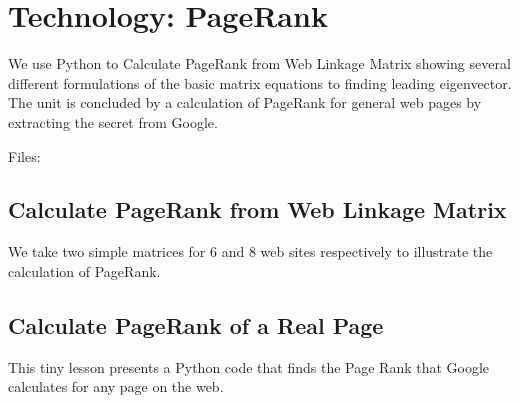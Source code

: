 \section{Technology: PageRank}\label{technology-pagerank}

We use Python to Calculate PageRank from Web Linkage Matrix showing
several different formulations of the basic matrix equations to finding
leading eigenvector. The unit is concluded by a calculation of PageRank
for general web pages by extracting the secret from Google.

Files:




\subsection{Calculate PageRank from Web Linkage
Matrix}\label{calculate-pagerank-from-web-linkage-matrix}

We take two simple matrices for 6 and 8 web sites respectively to
illustrate the calculation of PageRank.

\subsection{Calculate PageRank of a Real
Page}\label{calculate-pagerank-of-a-real-page}

This tiny lesson presents a Python code that finds the Page Rank that
Google calculates for any page on the web.
